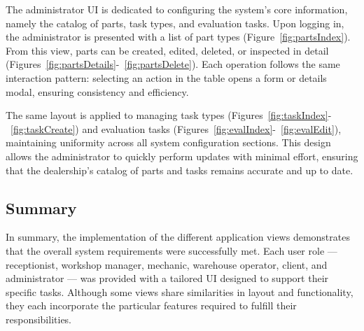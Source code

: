 The administrator \ac{UI} is dedicated to configuring the system's core information, namely the catalog of parts, task types, and evaluation tasks. Upon logging in, the administrator is presented with a list of part types (Figure~\ref{fig:partsIndex}). From this view, parts can be created, edited, deleted, or inspected in detail (Figures~\ref{fig:partsDetails}-~\ref{fig:partsDelete}). Each operation follows the same interaction pattern: selecting an action in the table opens a form or details modal, ensuring consistency and efficiency.




The same layout is applied to managing task types (Figures~\ref{fig:taskIndex}-~\ref{fig:taskCreate}) and evaluation tasks (Figures~\ref{fig:evalIndex}-~\ref{fig:evalEdit}), maintaining uniformity across all system configuration sections. This design allows the administrator to quickly perform updates with minimal effort, ensuring that the dealership's catalog of parts and tasks remains accurate and up to date.


\subsection{Summary}

In summary, the implementation of the different application views demonstrates that the overall system requirements were successfully met. Each user role — receptionist, workshop manager, mechanic, warehouse operator, client, and administrator — was provided with a tailored \ac{UI} designed to support their specific tasks. Although some views share similarities in layout and functionality, they each incorporate the particular features required to fulfill their responsibilities. 






